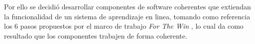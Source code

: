     \noindent Por ello se decidió desarrollar componentes de software coherentes que extiendan la funcionalidad de un sistema de aprendizaje en linea, tomando como referencia los 6 pasos propuestos por el marco de trabajo {\it For The Win} \cite{FrameWorkForTheWin}, lo cual da como resultado que los componentes trabajen de forma coherente. 
    
\begin{comment}
    Los seis pasos son:
    
    \begin{quote}
    \begin{enumerate}
        \item Definir los objetivos del sistema.
        \item Definir los comportamientos que queremos que tengan los usuarios.
        \item Describir nuestro usuarios.
        \item Desarrollar los ciclos de las actividades.
        \item Considerar en todo momento la diversión.
        \item Elije los componentes apropiados para el sistema.
    \end{enumerate}
    \end{quote}
\end{comment}    
    
